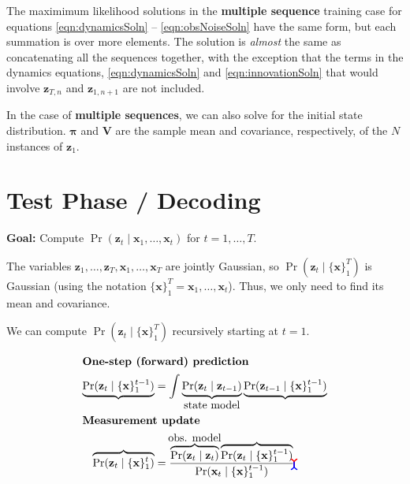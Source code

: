 \documentclass[11pt]{article}
\newcommand{\tikzmark}[1]{\tikz[overlay,remember picture] \node (#1) {};}
\newcommand{\xb}{\mathbf{x}}
\newcommand{\zb}{\mathbf{z}}
\begin{document}
The maximimum likelihood solutions in the \textbf{multiple sequence} training
case for equations \eqref{eqn:dynamicsSoln} -- \eqref{eqn:obsNoiseSoln} have
the same form, but each summation is over more elements. The solution is
\textit{almost} the same as concatenating all the sequences together, with
the exception that the terms in the dynamics equations, \eqref{eqn:dynamicsSoln}
and \eqref{eqn:innovationSoln} that would involve $\zb_{T,n}$ and $\zb_{1,n+1}$
are not included.

In the case of \textbf{multiple sequences}, we can also solve for the initial
state distribution. $\symbf{\pi}$ and $\mathbf{V}$ are the sample mean and
covariance, respectively, of the $N$ instances of $\zb_1$.

\section{Test Phase / Decoding}
\textbf{Goal:} Compute $\Pr(\zb_t \mid \xb_1, \ldots, \xb_t)$ for $t=1, \ldots, T$.

The variables $\zb_1, \ldots, \zb_T, \xb_1, \ldots, \xb_T$ are jointly
Gaussian, so $\Pr(\zb_t \mid \{\xb\}_1^T)$ is Gaussian (using the notation
$\{\xb\}_1^T = \xb_1, \ldots, \xb_t$). Thus, we only need to find its mean
and covariance.

We can compute $\Pr(\zb_t \mid \{\xb\}_1^T)$ recursively starting at $t=1$.

\begin{align}
  \intertext{\textbf{One-step (forward) prediction}}
  \underbrace{\Pr(\zb_t \mid \{\xb\}_1^{t-1})}_{\tikzmark{a}} &= \int
  \underbrace{\Pr(\zb_t \mid \zb_{t-1})}_{\mathclap{\text{\normalsize state model}}}
  \underbrace{\Pr(\zb_{t-1} \mid \{\xb\}_1^{t-1})}_{\tikzmark{c}}
  \label{eqn:forward}\\
  \intertext{\textbf{Measurement update}}
  \overbrace{\Pr(\zb_t \mid \{\xb\}_1^t)}^{\tikzmark{d}} &= \frac{
  \overbrace{\Pr(\zb_t \mid \zb_t)}^{\mathclap{\text{\normalsize obs. model}}}
  \overbrace{\Pr(\zb_t \mid \{\xb\}_1^{t-1})}^{\tikzmark{b}}}
  {\Pr(\xb_t \mid \{\xb\}_1^{t-1})}
  \label{eqn:update}
  \begin{tikzpicture}[overlay,remember picture,very thick]
    \draw (a.center) edge[out=270, in=90, ->,red] (b.north);
    \draw (d.north) edge[out=90, in=270, ->,blue]  (c.center);
  \end{tikzpicture}
\end{align}
\end{document}
